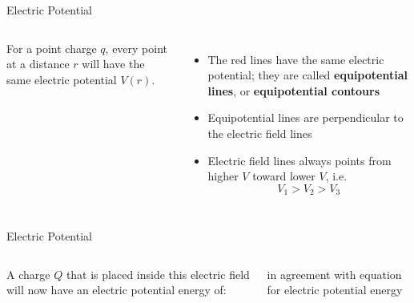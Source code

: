 \documentclass[12pt,aspectratio=169]{beamer}
\begin{document}
\begin{frame}{Electric Potential}
  \begin{columns}
    \centering
 
    For a point charge $q$, every point at a distance $r$ will have the same
    electric potential $V(r)$.
    \begin{itemize}
    \item The red lines have the same electric potential; they are called
      \textbf{equipotential lines}, or \textbf{equipotential contours}
    \item Equipotential lines are perpendicular to the electric field lines
    \item Electric field lines always points from higher $V$ toward lower $V$,
      i.e.
      \begin{displaymath}
        V_1>V_2>V_3
      \end{displaymath}
    \end{itemize}
  \end{columns}
\end{frame}



\begin{frame}{Electric Potential}
  \begin{columns}
    \centering
    
    A charge $Q$ that is placed inside this electric field will now have an
    electric potential energy of:


    in agreement with equation for electric potential energy
  \end{columns}
\end{frame}
\end{document}
